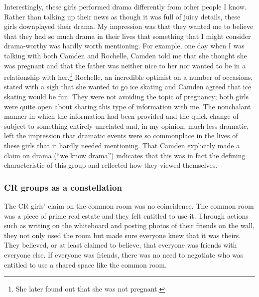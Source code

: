 Interestingly, these girls performed drama differently from other people I know. Rather than talking up their news as though it was full of juicy details, these girls downplayed their drama. My impression was that they wanted me to believe that they had so much drama in their lives that something that I might consider drama-worthy was hardly worth mentioning. For example, one day when I was talking with both Camden and Rochelle, Camden told me that she thought she was pregnant and that the father was neither nice to her nor wanted to be in a relationship with her.\footnote{She later found out that she was not pregnant.}  Rochelle, an incredible optimist on a number of occasions, stated with a sigh that she wanted to go ice skating and Camden agreed that ice skating would be fun. They were not avoiding the topic of pregnancy; both girls were quite open about sharing this type of information with me. The nonchalant manner in which the information had been provided and the quick change of subject to something entirely unrelated and, in my opinion, much less dramatic, left the impression that dramatic events were so commonplace in the lives of these girls that it hardly needed mentioning. That Camden explicitly made a claim on drama (``we know drama'') indicates that this was in fact the defining characteristic of this group and reflected how they viewed themselves.


\largerpage
\subsubsection{CR groups as a constellation}
  
The CR girls' claim on the common room was no coincidence. The common room was a piece of prime real estate and they felt entitled to use it. Through actions such as writing on the whiteboard and posting photos of their friends on the wall, they not only used the room but made sure everyone knew that it was theirs. They believed, or at least claimed to believe, that everyone was friends with everyone else. If everyone was friends, there was no need to negotiate who was entitled to use a shared space like the common room.

